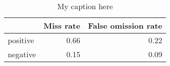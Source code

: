 \begin{table}[!ht]
\centering
\begin{tabular}{lrr}
\toprule
{} &  Miss rate &  False omission rate \\
\midrule
positive &       0.66 &                 0.22 \\
negative &       0.15 &                 0.09 \\
\bottomrule
\end{tabular}
\caption{My caption here}
\label{tab:POLARITY-ocd-combined-errors}
\end{table}